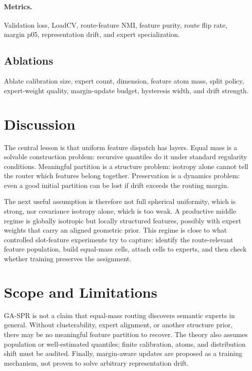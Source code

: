 \documentclass{article}
\begin{document}
\paragraph{Metrics.} Validation loss, LoadCV, route-feature NMI, feature purity,
route flip rate, margin p05, representation drift, and expert specialization.

\subsection{Ablations}

Ablate calibration size, expert count, dimension, feature atom mass, split policy,
expert-weight quality, margin-update budget, hysteresis width, and drift strength.

\section{Discussion}

The central lesson is that uniform feature dispatch has layers.  Equal mass is a
solvable construction problem: recursive quantiles do it under standard
regularity conditions.  Meaningful partition is a structure problem: isotropy
alone cannot tell the router which features belong together.  Preservation is a
dynamics problem: even a good initial partition can be lost if drift exceeds the
routing margin.

The next useful assumption is therefore not full spherical uniformity, which is
strong, nor covariance isotropy alone, which is too weak.  A productive middle
regime is globally isotropic but locally structured features, possibly with
expert weights that carry an aligned geometric prior.  This regime is close to
what controlled slot-feature experiments try to capture: identify the
route-relevant feature population, build equal-mass cells, attach cells to
experts, and then check whether training preserves the assignment.

\section{Scope and Limitations}

GA-SPR is not a claim that equal-mass routing discovers semantic experts in
general.  Without clusterability, expert alignment, or another structure prior,
there may be no meaningful feature partition to recover.  The theory also assumes
population or well-estimated quantiles; finite calibration, atoms, and
distribution shift must be audited.  Finally, margin-aware updates are proposed
as a training mechanism, not proven to solve arbitrary representation drift.
\end{document}
